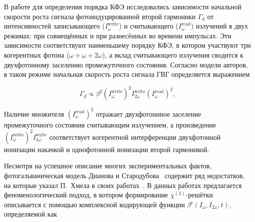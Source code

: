 
В работе \cite{dianov1995photoinduced} для определения порядка КФЭ исследовались зависимости начальной скорости роста сигнала фотоиндуцированной второй гармоники $\Gamma_d$ от интенсивностей записывающего ($I_\omega^{\mathrm{write}}$) и считывающего ($I_\omega^{\mathrm{read}}$) излучений в двух режимах: при совмещённых и при разнесённых во времени импульсах. Эти зависимости соответствуют наименьшему порядку КФЭ, в котором участвуют три когерентных фотона ($\omega + \omega + 2\omega$), а вклад считывающего излучения сводится к двухфотонному заселению промежуточного состояния. Согласно модели авторов, в таком режиме начальная скорость роста сигнала ГВГ определяется выражением

\begin{equation}\label{eq:gamma_dianov}
	\Gamma_d \propto \beta^2 (I_\omega^{\mathrm{write}})^2 I_{2\omega}^{\mathrm{write}} (I_\omega^{\mathrm{read}})^2,
\end{equation}

 Наличие множителя $(I_\omega^{\mathrm{read}})^2$ отражает двухфотоннное заселение промежуточного состояния считывающим излучением, а произведение $(I_\omega^{\mathrm{write}})^2 I_{2\omega}^{\mathrm{write}}$ соответствует когерентной интерференции двухфотонной ионизации накачкой и однофотонной ионизации второй гармоникой.

Несмотря на успешное описание многих экспериментальных фактов, фотогальваническая модель Дианова и Стародубова~\cite{dianov1995photoinduced} содержит ряд недостатков, на которые указал П.~Хмела в своих работах~\cite{chmela1992puzzle, chmela1998first, chmela1998puzzling}. В данных работах предлагается феноменологический подход, в котором формирование $\chi^{(2)}$-решётки описывается с помощью комплексной кодирующей функции $\mathcal{F}(I_\omega, I_{2\omega}, t)$, определяемой как

